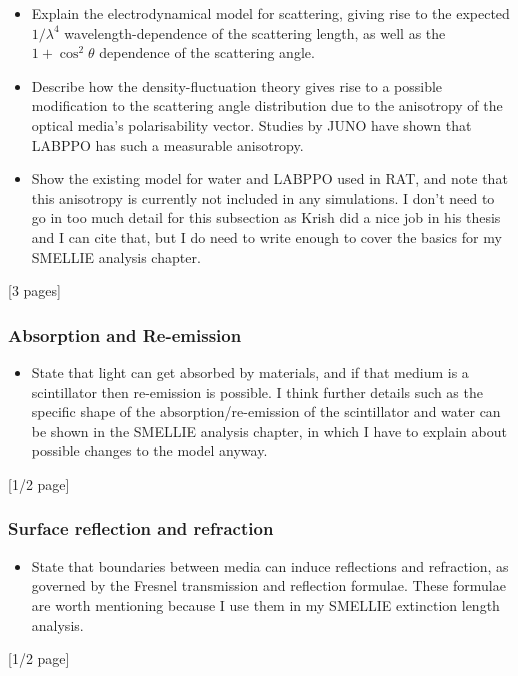 {
    \color{blue}

    \begin{itemize}
        \item Explain the electrodynamical model for scattering, giving rise to the expected $1/\lambda^4$ wavelength-dependence of the scattering length, as well as the $1+\cos^2\theta$ dependence of the scattering angle.
        \item Describe how the density-fluctuation theory gives rise to a possible modification to the scattering angle distribution due to the anisotropy of the optical media's polarisability vector. Studies by JUNO have shown that LABPPO has such a measurable anisotropy.
        \item Show the existing model for water and LABPPO used in RAT, and note that this anisotropy is currently not included in any simulations. I don't need to go in too much detail for this subsection as Krish did a nice job in his thesis and I can cite that, but I do need to write enough to cover the basics for my SMELLIE analysis chapter.
    \end{itemize}
    [3 pages]
    \subsubsection{Absorption and Re-emission}
    \begin{itemize}
        \item State that light can get absorbed by materials, and if that medium is a scintillator then re-emission is possible. I think further details such as the specific shape of the absorption/re-emission of the scintillator and water can be shown in the SMELLIE analysis chapter, in which I have to explain about possible changes to the model anyway.
    \end{itemize}
    [1/2 page]
    \subsubsection{Surface reflection and refraction}
    \begin{itemize}
        \item State that boundaries between media can induce reflections and refraction, as governed by the Fresnel transmission and reflection formulae. These formulae are worth mentioning because I use them in my SMELLIE extinction length analysis.
    \end{itemize}
    [1/2 page]
}
